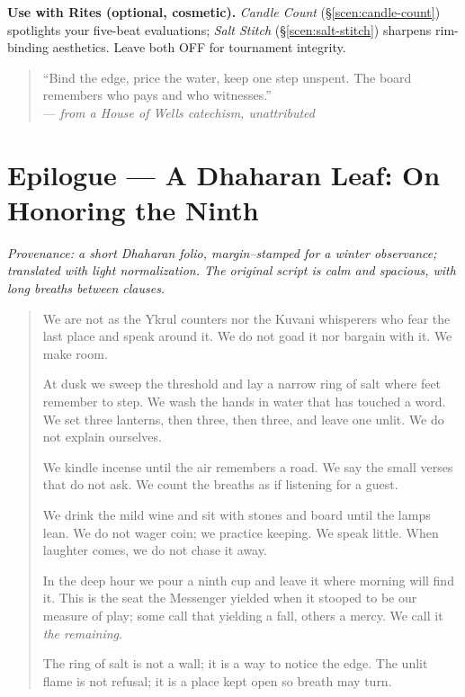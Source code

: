 \documentclass[11pt]{article}
\begin{document}
\begin{itemize}
\medskip
\noindent\textbf{Use with Rites (optional, cosmetic).} \emph{Candle Count} (\S\ref{scen:candle-count}) spotlights your five-beat evaluations; \emph{Salt Stitch} (\S\ref{scen:salt-stitch}) sharpens rim-binding aesthetics. Leave both \textsc{OFF} for tournament integrity.

\medskip
\begin{quote}\small
“Bind the edge, price the water, keep one step unspent. The board remembers who pays and who witnesses.”\\
\hfill — \textit{from a House of Wells catechism, unattributed}
\end{quote}

\section*{Epilogue — A Dhaharan Leaf: On Honoring the Ninth}
\label{epilogue:dhahara-ninth}
{}

\noindent\textit{Provenance: a short Dhaharan folio, margin–stamped for a winter observance; translated with light normalization. The original script is calm and spacious, with long breaths between clauses.}

\medskip
\begin{quote}\small
We are not as the Ykrul counters nor the Kuvani whisperers who fear the last place and speak around it. We do not goad it nor bargain with it. We make room.

At dusk we sweep the threshold and lay a narrow ring of salt where feet remember to step. We wash the hands in water that has touched a word. We set three lanterns, then three, then three, and leave one unlit. We do not explain ourselves.

We kindle incense until the air remembers a road. We say the small verses that do not ask. We count the breaths as if listening for a guest.

We drink the mild wine and sit with stones and board until the lamps lean. We do not wager coin; we practice keeping. We speak little. When laughter comes, we do not chase it away.

In the deep hour we pour a ninth cup and leave it where morning will find it. This is the seat the Messenger yielded when it stooped to be our measure of play; some call that yielding a fall, others a mercy. We call it \emph{the remaining}.

The ring of salt is not a wall; it is a way to notice the edge. The unlit flame is not refusal; it is a place kept open so breath may turn.


\end{quote}
\end{itemize}
\end{document}
